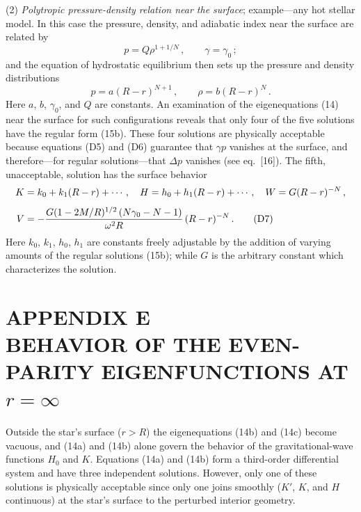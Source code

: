 \documentclass[12pt]{article}
\begin{document}
(2) \textit{Polytropic pressure-density relation near the surface}; example---any hot stellar model.
In this case the pressure, density, and adiabatic index near the surface are related by
%
\begin{equation}
p = Q\rho^{1+1/N} \,, \qquad \gamma = \gamma_0 \,;
\tag{D5}
\end{equation}
%
and the equation of hydrostatic equilibrium then sets up the pressure and density distributions
%
\begin{equation}
p = a(R - r)^{N+1} \,, \qquad \rho = b(R - r)^N \,.
\tag{D6}
\end{equation}
%
Here $a$, $b$, $\gamma_0$, and $Q$ are constants. An examination of the eigenequations (14) near the
surface for such configurations reveals that only four of the five solutions have the regular form
(15b). These four solutions are physically acceptable because equations (D5) and (D6) guarantee
that $\gamma p$ vanishes at the surface, and therefore---for regular solutions---that $\Delta p$ vanishes
(see eq.\ [16]). The fifth, unacceptable, solution has the surface behavior
%
\begin{align}
K &= k_0 + k_1(R - r) + \cdots \,, \quad
H = h_0 + h_1(R - r) + \cdots \,, \quad
W = G(R - r)^{-N} \,, \notag \\[4pt]
V &= -\frac{G(1 - 2M/R)^{1/2}\,(N\gamma_0 - N - 1)}{\omega^2 R}\,(R - r)^{-N} \,.
\tag{D7}
\end{align}
%
Here $k_0$, $k_1$, $h_0$, $h_1$ are constants freely adjustable by the addition of varying amounts of
the regular solutions (15b); while $G$ is the arbitrary constant which characterizes the solution.

\section*{APPENDIX E \\ BEHAVIOR OF THE EVEN-PARITY EIGENFUNCTIONS AT $r = \infty$}

Outside the star's surface ($r > R$) the eigenequations (14b) and (14c) become vacuous, and
(14a) and (14b) alone govern the behavior of the gravitational-wave functions $H_0$ and $K$.
Equations (14a) and (14b) form a third-order differential system and have three independent
solutions. However, only one of these solutions is physically acceptable since only one joins
smoothly ($K'$, $K$, and $H$ continuous) at the star's surface to the perturbed interior geometry.
\end{document}
